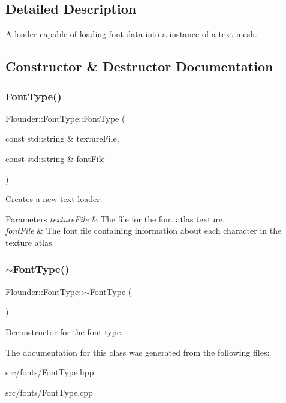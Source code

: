 \subsection{Detailed Description}
A loader capable of loading font data into a instance of a text mesh. 



\subsection{Constructor \& Destructor Documentation}
\mbox{\label{class_flounder_1_1_font_type_a3709ab2bf78c498c59cba9f475e95c21}} 
\subsubsection{\texorpdfstring{Font\+Type()}{FontType()}}
{\footnotesize\ttfamily Flounder\+::\+Font\+Type\+::\+Font\+Type (\begin{DoxyParamCaption}\item[{const std\+::string \&}]{texture\+File,  }\item[{const std\+::string \&}]{font\+File }\end{DoxyParamCaption})}



Creates a new text loader. 


\begin{DoxyParams}{Parameters}
{\em texture\+File} & The file for the font atlas texture. \\
\hline
{\em font\+File} & The font file containing information about each character in the texture atlas. \\
\hline
\end{DoxyParams}
\mbox{\label{class_flounder_1_1_font_type_a3d4292499d2cf721d0f87f2057c793b0}} 
\subsubsection{\texorpdfstring{$\sim$\+Font\+Type()}{~FontType()}}
{\footnotesize\ttfamily Flounder\+::\+Font\+Type\+::$\sim$\+Font\+Type (\begin{DoxyParamCaption}{ }\end{DoxyParamCaption})}



Deconstructor for the font type. 



The documentation for this class was generated from the following files\+:\begin{DoxyCompactItemize}
\item 
src/fonts/Font\+Type.\+hpp\item 
src/fonts/Font\+Type.\+cpp\end{DoxyCompactItemize}
